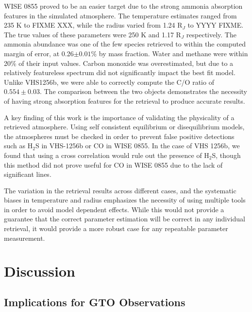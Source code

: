 WISE 0855 proved to be an easier target due to the strong ammonia absorption features in the simulated atmosphere.
The temperature estimates ranged from 235 K to FIXME XXX, while the radius varied from 1.24 R$_{J}$ to YYYY FIXME.
The true values of these parameters were 250 K and 1.17 R$_{J}$ respectively.
The ammonia abundance was one of the few species retrieved to within the computed margin of error, at 0.26$\pm0.01$\% by mass fraction.
Water and methane were within 20\% of their input values.
Carbon monoxide was overestimated, but due to a relatively featureless spectrum did not significantly impact the best fit model.
Unlike VHS1256b, we were able to correctly compute the C/O ratio of $0.554\pm0.03$.
The comparison between the two objects demonstrates the necessity of having strong absorption features for the retrieval to produce accurate results.

A key finding of this work is the importance of validating the physicality of a retrieved atmosphere.
Using self consistent equilibrium or disequilibrium models, the atmospheres must be checked in order to prevent false positive detections such as H$_{2}$S in VHS-1256b or CO in WISE 0855.
In the case of VHS 1256b, we found that using a cross correlation would rule out the presence of H$_{2}$S, though this method did not prove useful for CO in WISE 0855 due to the lack of significant lines.

The variation in the retrieval results across different cases, and the systematic biases in temperature and radius emphasizes the necessity of using multiple tools in order to avoid model dependent effects.
While this would not provide a guarantee that the correct parameter estimation will be correct in any individual retrieval, it would provide a more robust case for any repeatable parameter measurement. 
\section{Discussion}
\subsection{Implications for GTO Observations}
